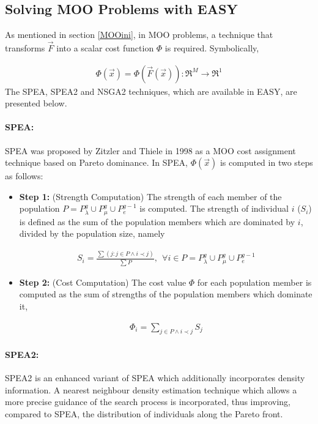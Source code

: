 \subsection{Solving MOO Problems with EASY}
\label{MOO}
As mentioned in section \ref{MOOini}, in MOO problems, a technique that transforms $\vec{F}$ into a scalar cost function $\Phi$ is required. Symbolically,

\begin{eqnarray}
    \Phi(\vec{x})=\Phi(\vec{F}(\vec{x})) :\Re ^M \rightarrow \Re ^1 
	\label{MOOeq}
\end{eqnarray}
The SPEA, SPEA2 and NSGA2 techniques, which are available in EASY, are presented below.

\paragraph{SPEA:}
SPEA was proposed by Zitzler and Thiele \cite{ZiTh98} in 1998 as a MOO cost assignment technique based on Pareto dominance. In SPEA, $\Phi(\vec{x})$ is computed in two steps as follows:
\begin{itemize}

\item[]{\bf Step 1:}  (Strength Computation) The strength of each member of the population $P=P_{\lambda}^g \cup P_{\mu}^g \cup P_{e}^{g-1}$ is computed. The strength of individual $i$ ($S_i$) is defined as the sum of the population members which are dominated  by $i$, divided by the population size, namely 

\begin{eqnarray}
	S_i = \frac{\sum(j : j \in P \wedge i \prec j)} {\sum P}, ~~ \forall i \in P =P_{\lambda}^g \cup P_{\mu}^g \cup P_{e}^{g-1}  
\end{eqnarray}

\item[]{\bf Step 2:}  (Cost Computation) The cost value $\Phi$ for each population member is computed as the sum of strengths of the population members which dominate it,

\begin{eqnarray}
	\Phi_i = \sum _{j \in P \wedge i \prec j}S_j
\end{eqnarray}
\end{itemize}
  
 
\paragraph{SPEA2:}
SPEA2 \cite{Zitz02} is an enhanced variant of SPEA which additionally incorporates density information. A nearest neighbour density estimation technique which allows a more precise guidance of the search process is incorporated, thus improving, compared to SPEA, the distribution of individuals along the Pareto front. 


